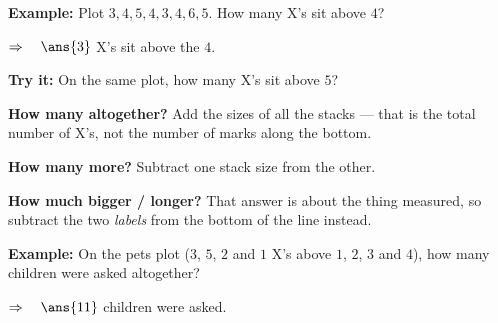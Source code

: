 \documentclass[12pt]{article}
\begin{document}
\begin{examplebox}
\textbf{Example:} \quad Plot $3, 4, 5, 4, 3, 4, 6, 5$. How many \textsf{X}'s sit above $4$?
\begin{center}
\end{center}

$\Rightarrow\quad \ans{3}$ \textsf{X}'s sit above the $4$.
\end{examplebox}

\begin{tryitbox}
\textbf{Try it:} \quad On the same plot, how many \textsf{X}'s sit above $5$?\\[2pt]
\end{tryitbox}


\begin{formulabox}
\textbf{How many altogether?} Add the sizes of all the stacks --- that is the total number of
\textsf{X}'s, not the number of marks along the bottom.\par
\smallskip
\textbf{How many more?} Subtract one stack size from the other.\par
\smallskip
\textbf{How much bigger / longer?} That answer is about the thing measured, so subtract the
two \emph{labels} from the bottom of the line instead.
\end{formulabox}

\begin{examplebox}
\textbf{Example:} \quad On the pets plot ($3$, $5$, $2$ and $1$ \textsf{X}'s above $1$, $2$,
$3$ and $4$), how many children were asked altogether?

$\Rightarrow\quad \ans{11}$ children were asked.
\end{examplebox}
\end{document}
